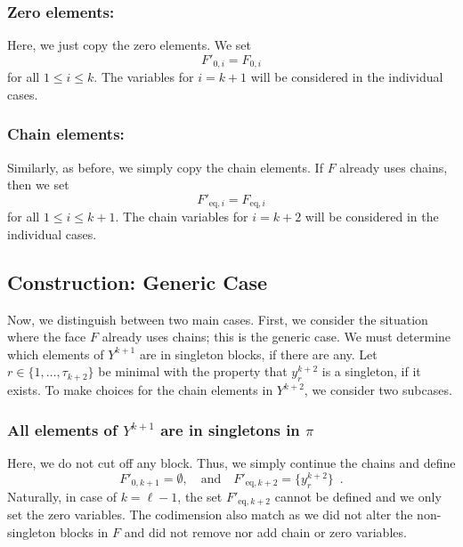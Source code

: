 \documentclass[12pt,a4paper]{amsart}
\theoremstyle{definition}
\begin{document}
\subsubsection{Zero elements:}
Here, we just copy the zero elements. We set
\begin{equation*}
  F'_{0,i}=F_{0,i}
\end{equation*}
for all $1\leq i\leq k$. 
The variables for $i=k+1$ will be considered in the individual cases.

\subsubsection{Chain elements:}
Similarly, as before, we simply copy the chain elements.
If $F$ already uses chains, then we set
\begin{equation*}
  F'_{\mathrm{eq},i}=F_{\mathrm{eq},i}
\end{equation*}
for all $1\leq i\leq k+1$. 
The chain variables for $i=k+2$ will be considered in the individual cases.

\subsection{Construction: Generic Case}
Now, we distinguish between two main cases.
First, we consider the situation where the face $F$ already uses chains; this is the generic case.
We must determine which elements of $Y^{k+1}$ are in singleton blocks, if there are any.
Let $r\in\{1,\ldots,\tau_{k+2}\}$ be minimal with the property that $y_{r}^{{k+2}}$ is a singleton, if it exists.
To make choices for the chain elements in $Y^{k+2}$, we consider two subcases.

\subsubsection{All elements of $Y^{{k+1}}$ are in singletons in $\pi$}\label{Case-Gen-Single}
Here, we do not cut off any block. Thus, we simply continue the chains and define
\begin{equation*}
    F'_{0,k+1}=\emptyset,\quad \text{and} \quad F'_{\mathrm{eq},k+2}=\{y_{r}^{{k+2}}\} \enspace .
\end{equation*}
Naturally, in case of $k=\ell-1$, the set $F'_{\mathrm{eq},k+2}$ cannot be defined and we only set the zero variables.
The codimension also match as we did not alter the non-singleton blocks in $F$ and did not remove nor add chain or zero variables.
\end{document}
